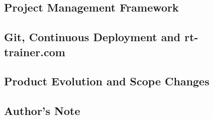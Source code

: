 \subsection{Project Management Framework}
\label{sse:pmframework}

\subsection{Git, Continuous Deployment and rt-trainer.com}
\label{sse:git-cd-rt-trainer}


\subsection{Product Evolution and Scope Changes}
\label{sse:evolution-scope}

\subsection{Author's Note}
\label{sse:authorsnote}